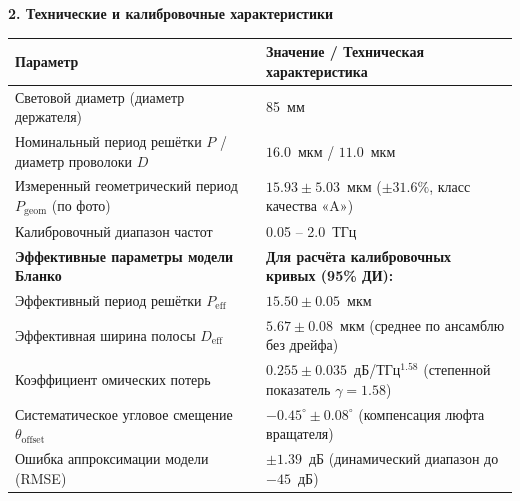 \documentclass[11pt]{article}
\begin{document}
	\vspace{0.3em}
	
	\noindent\textbf{2. Технические и калибровочные характеристики}
	\begin{table}[H]
		\centering
		\small
		\begin{tabularx}{\textwidth}{lX}
			\toprule
			\textbf{Параметр} & \textbf{Значение / Техническая характеристика} \\
			\midrule
			Световой диаметр (диаметр держателя) & 85~мм \\
			Номинальный период решётки $P$ / диаметр проволоки $D$
				& $16.0$~мкм / $11.0$~мкм \\
			Измеренный геометрический период $P_{\text{geom}}$ (по фото)
				& $15.93 \pm 5.03$~мкм ($\pm 31.6\%$, класс качества «A») \\
			Калибровочный диапазон частот & 0.05 -- 2.0~ТГц \\
			\midrule
			\textbf{Эффективные параметры модели Бланко}
				& \textbf{Для расчёта калибровочных кривых (95\% ДИ):} \\
			Эффективный период решётки $P_{\text{eff}}$
				& $15.50 \pm 0.05$~мкм \\
			Эффективная ширина полосы $D_{\text{eff}}$\footnotemark[1]
				& $5.67 \pm 0.08$~мкм (среднее по ансамблю без дрейфа) \\
			Коэффициент омических потерь
				& $0.255 \pm 0.035$~дБ/ТГц$^{1.58}$ (степенной показатель $\gamma = 1.58$) \\
			Систематическое угловое смещение $\theta_{\text{offset}}$
				& $-0.45^\circ \pm 0.08^\circ$ (компенсация люфта вращателя) \\
			Ошибка аппроксимации модели (RMSE)\footnotemark[2]
				& $\pm 1.39$~дБ (динамический диапазон до $-45$~дБ) \\
			\bottomrule
		\end{tabularx}
	\end{table}
	
\end{document}
